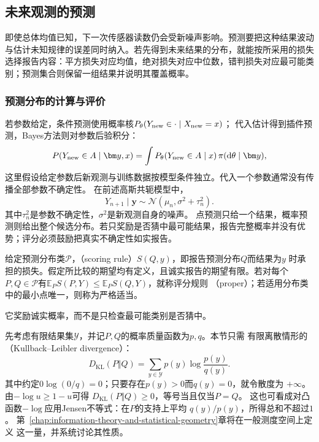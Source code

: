 \subsection{未来观测的预测}
\label{sec:stats-prediction-observation-limits}
即使总体均值已知，下一次传感器读数仍会受新噪声影响。预测要把这种结果波动与估计未知规律的误差同时纳入。若先得到未来结果的分布，就能按所采用的损失选择报告内容：平方损失对应均值，绝对损失对应中位数，错判损失对应最可能类别；预测集合则保留一组结果并说明其覆盖概率。

\subsubsection{预测分布的计算与评价}
\label{sec:statistics-scoring-calibration}
若参数给定，条件预测使用概率核\(P_\theta(Y_{\rm new}\in\cdot\mid X_{\rm new}=x)\)；
代入估计得到插件预测，Bayes方法则对参数后验积分：
\[
P(Y_{\rm new}\in A\mid\bm y,x)
=\int P_\theta(Y_{\rm new}\in A\mid x)\,\pi(\mathrm d\theta\mid\bm y),
\]
这里假设给定参数后新观测与训练数据按模型条件独立。代入一个参数通常没有传播全部参数不确定性。
在前述高斯共轭模型中，
\[
  Y_{n+1}\mid\bm y
  \sim\mathcal N(\mu_n,\sigma^2+\tau_n^2).
\]
其中\(\tau_n^2\)是参数不确定性，\(\sigma^2\)是新观测自身的噪声。
点预测只给一个结果，概率预测则给出整个候选分布。若只奖励是否猜中最可能结果，报告完整概率并没有优势；评分必须鼓励把真实不确定性如实报告。
\begin{definition}[适当评分规则]
  \label{def:statistics-proper-scoring-rule}
  给定预测分布类\(\mathcal P\)，（scoring rule）\(S(Q,y)\)，即报告预测分布\(Q\)而结果为\(y\)
时承担的损失。假定所比较的期望均有定义，且诚实报告的期望有限。若对每个\(P,Q\in\mathcal P\)有\(\mathbb E_PS(P,Y)\leq\mathbb E_PS(Q,Y)\)，就称评分规则
（proper）；若适用分布类中的最小点唯一，则称为严格适当。
\end{definition}
它奖励诚实概率，而不是只检查最可能类别是否猜中。

先考虑有限结果集\(\mathcal Y\)，并记\(P,Q\)的概率质量函数为\(p,q\)。本节只需
有限离散情形的（Kullback--Leibler divergence）：
\[
  D_{\mathrm{KL}}(P\Vert Q)
  =
  \sum_{y\in\mathcal Y}p(y)\log\frac{p(y)}{q(y)}.
\]
其中约定\(0\log(0/q)=0\)；只要存在\(p(y)>0\)而\(q(y)=0\)，就令散度为
\(+\infty\)。由\(-\log u\geq1-u\)可得
\(D_{\mathrm{KL}}(P\Vert Q)\geq0\)，等号当且仅当\(P=Q\)。
这也可看成对凸函数\(-\log\)应用Jensen不等式：在\(P\)的支持上平均
\(q(y)/p(y)\)，所得总和不超过\(1\)。
第~\ref{chap:information-theory-and-statistical-geometry}章将在一般测度空间上定义
这一量，并系统讨论其性质。

